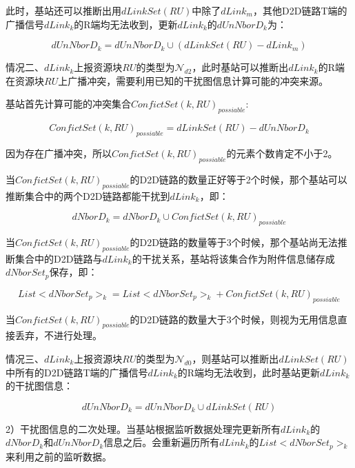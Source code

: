\documentclass[figurelist,tablelist,algorithmlist,nomlist,masters]{seuthesix}
\begin{document}
	此时，基站还可以推断出用$dLinkSet(RU)$中除了$dLink_m$，其他D2D链路T端的广播信号$dLink_k$的R端均无法收到，更新$dLink_k$的$dUnNborD_k$为：
	
	\begin{equation}\label{eq2.13}
	dUnNborD_k = dUnNborD_k \cup (dLinkSet(RU) - dLink_m)
	\end{equation}
	
	
	情况二、$dLink_k$上报资源块$RU$的类型为$\mathcal{N}_{d2}$，此时基站可以推断出$dLink_k$的R端在资源块$RU$上广播冲突，需要利用已知的干扰图信息计算可能的冲突来源。
	
	基站首先计算可能的冲突集合$ConfictSet{(k,RU)_{possiable}}$:
	
	\begin{equation}\label{eq2.14}
	ConfictSet{(k,RU)_{possiable}} = dLinkSet(RU) - dUnNborD_k
	\end{equation}
	
	因为存在广播冲突，所以$ConfictSet{(k,RU)_{possiable}}$的元素个数肯定不小于2。
	
	当$ConfictSet{(k,RU)_{possiable}}$的D2D链路的数量正好等于2个时候，那个基站可以推断集合中的两个D2D链路都能干扰到$dLink_k$，即：
	
	\begin{equation}\label{eq2.15}
	dNborD_k = dNborD_k \cup ConfictSet{(k,RU)_{possiable}}
	\end{equation}
	
	当$ConfictSet{(k,RU)_{possiable}}$的D2D链路的数量等于3个时候，那个基站尚无法推断集合中的D2D链路与$dLink_k$的干扰关系，基站将该集合作为附件信息储存成$dNborSet_{p}$保存，即：
	
	\begin{equation}\label{eq2.16}
	List < dNborSet_{p}{ > _k} = List < dNborSet_{p}{ > _k} + ConfictSet{(k,RU)_{possiable}}
	\end{equation}
	
	当$ConfictSet{(k,RU)_{possiable}}$的D2D链路的数量大于3个时候，则视为无用信息直接丢弃，不进行处理。
	
	
	情况三、$dLink_k$上报资源块$RU$的类型为$\mathcal{N}_{d0}$，则基站可以推断出$dLinkSet(RU)$中所有的D2D链路T端的广播信号$dLink_k$的R端均无法收到，此时基站更新$dLink_k$的干扰图信息：
	
	\begin{equation}\label{eq2.17}
	dUnNborD_k = dUnNborD_k \cup dLinkSet(RU)
	\end{equation}
	
	2）干扰图信息的二次处理。当基站根据监听数据处理完更新所有$dLink_k$的$dNborD_k$和$dUnNborD_k$信息之后。会重新遍历所有$dLink_k$的$List < dNborSet_{p}{ > _k}$来利用之前的监听数据。
	
\end{document}
